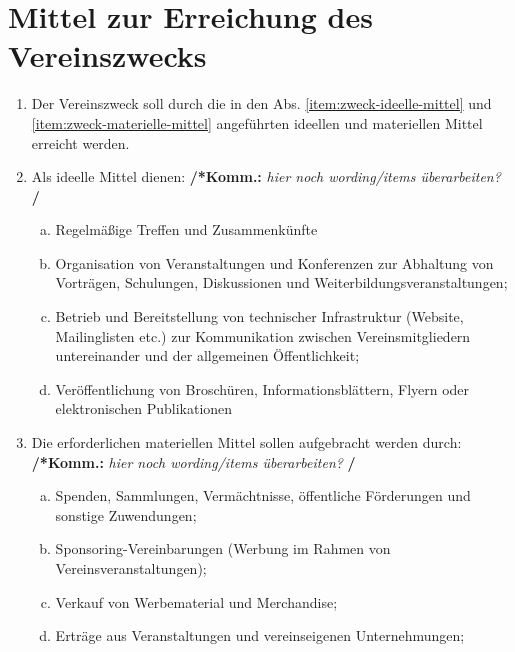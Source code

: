 \documentclass[a4paper,12pt]{article}
\newcommand{\comment}[1]{{\bf /*Komm.:} \textit{#1} {\bf */}}
\begin{document}
\section{Mittel zur Erreichung des Vereinszwecks}%
\label{sec:Mittel}
\begin{enumerate}
\item Der Vereinszweck soll durch die in den Abs. \ref{item:zweck-ideelle-mittel} und \ref{item:zweck-materielle-mittel} angeführten ideellen und materiellen Mittel erreicht werden.

\item\label{item:zweck-ideelle-mittel} Als ideelle Mittel dienen:
\comment{hier noch wording/items überarbeiten?}
\begin{enumerate}[(a)]
\item Regelmäßige Treffen und Zusammenkünfte
\item Organisation von Veranstaltungen und Konferenzen zur Abhaltung von Vorträgen, Schulungen, Diskussionen und Weiterbildungsveranstaltungen;
\item Betrieb und Bereitstellung von technischer Infrastruktur (Website, Mailinglisten etc.) zur Kommunikation zwischen Vereinsmitgliedern untereinander und der allgemeinen Öffentlichkeit;
\item Veröffentlichung von Broschüren, Informationsblättern, Flyern oder elektronischen Publikationen

\end{enumerate}
\item\label{item:zweck-materielle-mittel} Die erforderlichen materiellen Mittel sollen aufgebracht werden durch:
\comment{hier noch wording/items überarbeiten?}
\begin{enumerate}[(a)]
\item Spenden, Sammlungen, Vermächtnisse, öffentliche Förderungen und sonstige Zuwendungen;
\item Sponsoring-Vereinbarungen (Werbung im Rahmen von Vereinsveranstaltungen);
\item Verkauf von Werbematerial und Merchandise;
\item Erträge aus Veranstaltungen und vereinseigenen Unternehmungen;

\end{enumerate}
\end{enumerate}
\end{document}
